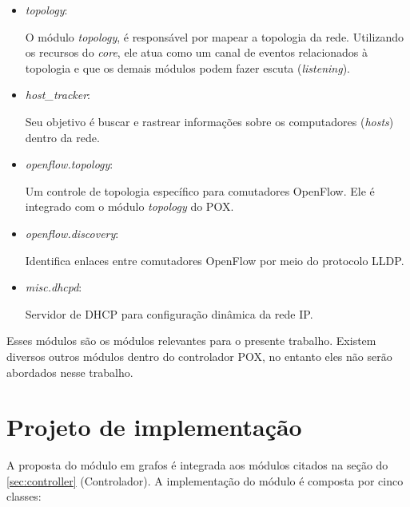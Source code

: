 \begin{itemize}

\item{\emph{topology}}: 

O módulo \emph{topology}, é responsável por mapear a topologia da rede. 
Utilizando os recursos do \emph{core}, ele atua como um canal de eventos 
relacionados à topologia e que os demais módulos podem fazer escuta 
(\emph{listening}).

\item{\emph{host\_tracker}}: 

Seu objetivo é buscar e rastrear informações sobre os computadores 
(\emph{hosts}) dentro da rede.

\item{\emph{openflow.topology}}: 

Um controle de topologia específico para comutadores OpenFlow.
Ele é integrado com o módulo \emph{topology} do POX.

\item{\emph{openflow.discovery}}: 

Identifica enlaces entre comutadores OpenFlow por meio do protocolo LLDP.

\item{\emph{misc.dhcpd}}:

Servidor de DHCP para configuração dinâmica da rede IP.

\end{itemize}

Esses módulos são os módulos relevantes para o presente trabalho.
Existem diversos outros módulos dentro do controlador POX, no entanto
eles não serão abordados nesse trabalho.

\section{Projeto de implementação}

A proposta do módulo em grafos é integrada aos módulos citados na seção do 
\ref{sec:controller} (Controlador).
A implementação do módulo é composta por cinco classes:

